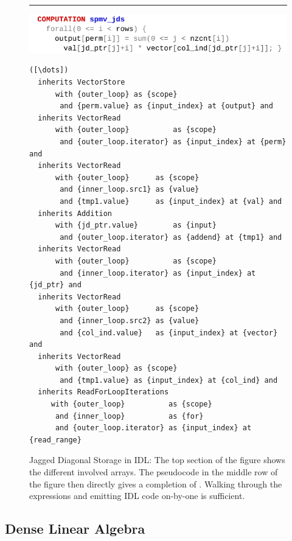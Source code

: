 \begin{figure}[p]
\vspace{0.8em}
\hrule
\vspace{0.3em}

\includegraphics[width=\linewidth]{figures/spmvjdswhat.pdf}
\vspace{-1.5em}
\begin{lstlisting}[language=IDL,firstnumber=7]
([\dots])
  inherits VectorStore
      with {outer_loop} as {scope}
       and {perm.value} as {input_index} at {output} and
  inherits VectorRead
      with {outer_loop}          as {scope}
       and {outer_loop.iterator} as {input_index} at {perm} and
  inherits VectorRead
      with {outer_loop}      as {scope}
       and {inner_loop.src1} as {value}
       and {tmp1.value}      as {input_index} at {val} and
  inherits Addition
      with {jd_ptr.value}        as {input}
       and {outer_loop.iterator} as {addend} at {tmp1} and
  inherits VectorRead
      with {outer_loop}          as {scope}
       and {inner_loop.iterator} as {input_index} at {jd_ptr} and
  inherits VectorRead
      with {outer_loop}      as {scope}
       and {inner_loop.src2} as {value}
       and {col_ind.value}   as {input_index} at {vector} and
  inherits VectorRead
      with {outer_loop} as {scope}
       and {tmp1.value} as {input_index} at {col_ind} and
  inherits ReadForLoopIterations
     with {outer_loop}          as {scope}
      and {inner_loop}          as {for}
      and {outer_loop.iterator} as {input_index} at {read_range}
\end{lstlisting}
\caption{Jagged Diagonal Storage in IDL:
         The top section of the figure shows the different involved arrays.
         The pseudocode in the middle row of the
         figure then directly gives a completion of .
         Walking through the expressions and emitting IDL code on-by-one is
         sufficient.}
\label{jds_lilacwhat_fig}
\end{figure}

\subsection{Dense Linear Algebra}

